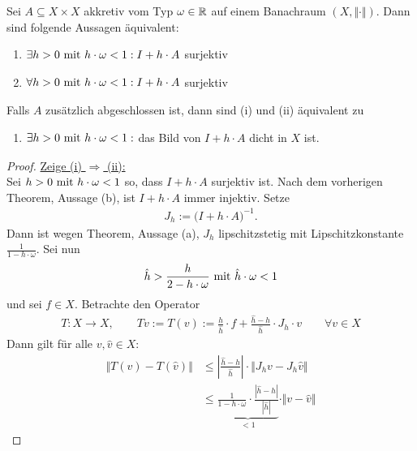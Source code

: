 \begin{theorem}
Sei $A\subseteq X\times X$ akkretiv vom Typ $\omega\in\R$ auf einem Banachraum $(X,\Vert\cdot\Vert)$. Dann sind folgende Aussagen äquivalent:
\begin{enumerate}[label=(\roman*)]
\item $\begin{aligned}
\exists h>0\mit h\cdot\omega<1:I+h\cdot A
\end{aligned}$ surjektiv
\item $\begin{aligned}
\forall h>0\mit h\cdot\omega<1: I+h\cdot A
\end{aligned}$ surjektiv
\end{enumerate}
Falls $A$ zusätzlich abgeschlossen ist, dann sind (i) und (ii) äquivalent zu
\begin{enumerate}[label=(iii)]
\item $\begin{aligned}
\exists h>0\mit h\cdot\omega<1:
\end{aligned}$ das Bild von $I+h\cdot A$ dicht in $X$ ist.
\end{enumerate}
\end{theorem}
\begin{proof}
\underline{Zeige (i) $\Rightarrow$ (ii):}\\
Sei $h>0\mit h\cdot\omega<1$ so, dass $I+h\cdot A$ surjektiv ist. Nach dem vorherigen Theorem, Aussage (b), ist $I+h\cdot A$ immer injektiv. Setze
\begin{align*}
J_h:=\big(I+h\cdot A\big)^{-1}.
\end{align*}
Dann ist wegen Theorem, Aussage (a), $J_h$ lipschitzstetig mit Lipschitzkonstante $\frac{1}{1-h\cdot\omega}$. Sei nun 
\begin{align*}
\hat{h}>\frac{h}{2-h\cdot\omega}\mit\hat{h}\cdot\omega<1
\end{align*}
und sei $f\in X$. Betrachte den Operator
\begin{align*}
T:X\to X,\qquad Tv:=T(v)
:=\frac{h}{\hat{h}}\cdot f+\frac{\hat{h}-h}{\hat{h}}\cdot J_h\cdot v\qquad\forall v\in X
\end{align*}
Dann gilt für alle $v,\hat{v}\in X$:
\begin{align*}
\Vert T(v)-T(\hat{v})\Vert
&\leq
\left|\frac{\hat{h}-h}{\hat{h}}\right|\cdot\big\Vert J_h v-J_h \hat{v}\big\Vert\\
&\leq
\underbrace{\frac{1}{1-h\cdot\omega}\cdot\frac{|\hat{h}-h|}{|\hat{h}|}}_{<1}\cdot\Vert v-\hat{v}\Vert
\end{align*}

\end{proof}